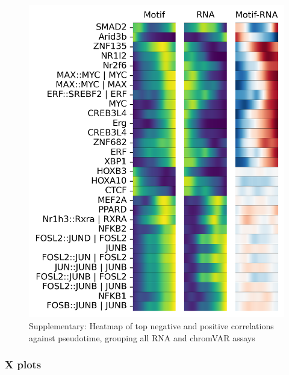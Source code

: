 \documentclass[a4paper]{article}
\begin{document}
\begin{figure}[!htb]
  \centering
  \includegraphics[width=\textwidth]{../figures/hematopoiesis/Myeloid DC_40_107_single_smooth_none_heatmap_grouped_assays.png}
  \caption{Supplementary: Heatmap of top negative and positive correlations against pseudotime, grouping all RNA and chromVAR assays}
\end{figure}

\FloatBarrier
\subsubsection{X plots}
 
\end{document}
